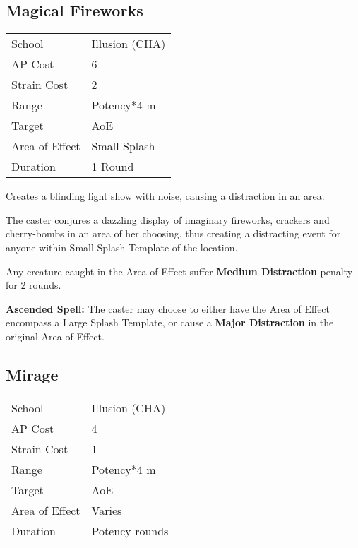\documentclass[11pt,a4paper,twocolumn]{book}
\begin{document}
\vfill

\subsection*{Magical Fireworks}
{
	\begin{tabu} to 75mm{| X[l,4] | X[l,7] |}
		\hline
		School 			& Illusion (CHA) 		\\
		AP Cost	      	& 6 					\\
		Strain Cost     & 2 					\\
		Range     		& Potency*4	m			\\
		Target      	& AoE					\\
		Area of Effect  & Small Splash  	 		\\
		Duration     	& 1 Round				\\ \hline
	\end{tabu}
	
}

\medskip

Creates a blinding light show with noise, causing a distraction in an area.

The caster conjures a dazzling display of imaginary fireworks, crackers and cherry-bombs in an area of her choosing, thus creating a distracting event for anyone within Small Splash Template of the location.

Any creature caught in the Area of Effect suffer \textbf{Medium Distraction} penalty for 2 rounds.

\medskip

\textbf{Ascended Spell:} The caster may choose to either have the Area of Effect encompass a Large Splash Template, or cause a \textbf{Major Distraction} in the original Area of Effect.


\subsection*{Mirage}
{
	\begin{tabu} to 75mm{| X[l,4] | X[l,7] |}
		\hline
		School 			& Illusion (CHA) 		\\
		AP Cost	      	& 4 					\\
		Strain Cost     & 1 					\\
		Range     		& Potency*4 m			\\
		Target      	& AoE					\\
		Area of Effect  & Varies  	 		\\
		Duration     	& Potency rounds 		\\ \hline
	\end{tabu}
	
}
\end{document}
